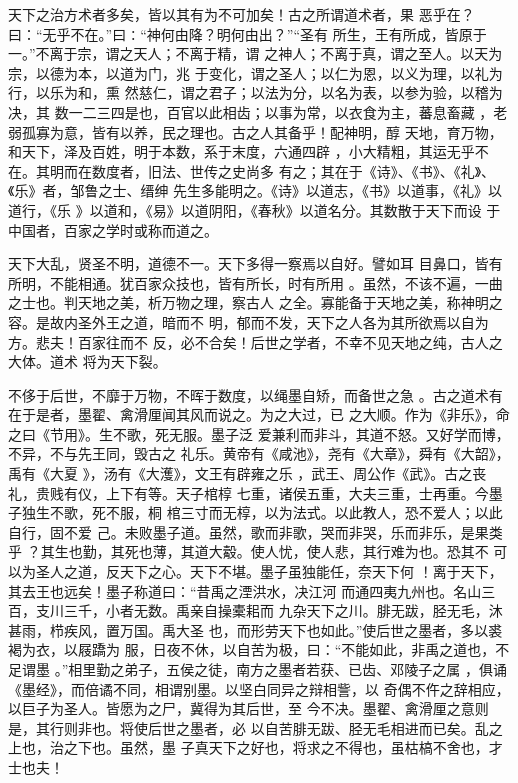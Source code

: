 \documentclass[12pt,UTF8]{ctexbook}
\begin{document}
天下之治方术者多矣，皆以其有为不可加矣！古之所谓道术者，果 恶乎在？曰：“无乎不在。”曰∶“神何由降？明何由出？”“圣有 所生，王有所成，皆原于一。”不离于宗，谓之天人；不离于精，谓 之神人；不离于真，谓之至人。以天为宗，以德为本，以道为门，兆 于变化，谓之圣人；以仁为恩，以义为理，以礼为行，以乐为和，熏 然慈仁，谓之君子；以法为分，以名为表，以参为验，以稽为决，其 数一二三四是也，百官以此相齿；以事为常，以衣食为主，蕃息畜藏 ，老弱孤寡为意，皆有以养，民之理也。古之人其备乎！配神明，醇 天地，育万物，和天下，泽及百姓，明于本数，系于末度，六通四辟 ，小大精粗，其运无乎不在。其明而在数度者，旧法、世传之史尚多 有之；其在于《诗》、《书》、《礼》、《乐》者，邹鲁之士、缙绅 先生多能明之。《诗》以道志，《书》以道事，《礼》以道行，《乐 》以道和，《易》以道阴阳，《春秋》以道名分。其数散于天下而设 于中国者，百家之学时或称而道之。

天下大乱，贤圣不明，道德不一。天下多得一察焉以自好。譬如耳 目鼻口，皆有所明，不能相通。犹百家众技也，皆有所长，时有所用 。虽然，不该不遍，一曲之士也。判天地之美，析万物之理，察古人 之全。寡能备于天地之美，称神明之容。是故内圣外王之道，暗而不 明，郁而不发，天下之人各为其所欲焉以自为方。悲夫！百家往而不 反，必不合矣！后世之学者，不幸不见天地之纯，古人之大体。道术 将为天下裂。

不侈于后世，不靡于万物，不晖于数度，以绳墨自矫，而备世之急 。古之道术有在于是者，墨翟、禽滑厘闻其风而说之。为之大过，已 之大顺。作为《非乐》，命之曰《节用》。生不歌，死无服。墨子泛 爱兼利而非斗，其道不怒。又好学而博，不异，不与先王同，毁古之 礼乐。黄帝有《咸池》，尧有《大章》，舜有《大韶》，禹有《大夏 》，汤有《大濩》，文王有辟雍之乐 ，武王、周公作《武》。古之丧礼，贵贱有仪，上下有等。天子棺椁 七重，诸侯五重，大夫三重，士再重。今墨子独生不歌，死不服，桐 棺三寸而无椁，以为法式。以此教人，恐不爱人；以此自行，固不爱 己。未败墨子道。虽然，歌而非歌，哭而非哭，乐而非乐，是果类乎 ？其生也勤，其死也薄，其道大觳。使人忧，使人悲，其行难为也。恐其不 可以为圣人之道，反天下之心。天下不堪。墨子虽独能任，奈天下何 ！离于天下，其去王也远矣！墨子称道曰：“昔禹之湮洪水，决江河 而通四夷九州也。名山三百，支川三千，小者无数。禹亲自操橐耜而 九杂天下之川。腓无跋，胫无毛，沐甚雨，栉疾风，置万国。禹大圣 也，而形劳天下也如此。”使后世之墨者，多以裘褐为衣，以屐蹻为 服，日夜不休，以自苦为极，曰：“不能如此，非禹之道也，不足谓墨 。”相里勤之弟子，五侯之徒，南方之墨者若获、已齿、邓陵子之属 ，俱诵《墨经》，而倍谲不同，相谓别墨。以坚白同异之辩相訾，以 奇偶不仵之辞相应，以巨子为圣人。皆愿为之尸，冀得为其后世，至 今不决。墨翟、禽滑厘之意则是，其行则非也。将使后世之墨者，必 以自苦腓无跋、胫无毛相进而已矣。乱之上也，治之下也。虽然，墨 子真天下之好也，将求之不得也，虽枯槁不舍也，才士也夫！
\end{document}
